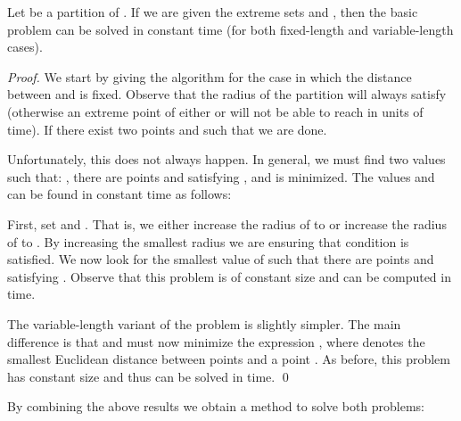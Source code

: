 \documentclass{llncs}
\begin{document}
\begin{lemma}\label{lemma:basic-cte}
Let  be a partition of . If we are given the extreme sets  and , then the basic problem can be solved in constant time (for both fixed-length and variable-length cases).
\end{lemma}
\begin{proof}
We start by giving the algorithm for the case in which the distance between  and  is fixed. Observe that the radius  of the partition will always satisfy  (otherwise an extreme point of either  or  will not be able to reach  in  units of time). If there exist two points  and  such that  we are done.

Unfortunately, this does not always happen. In general, we must find two values  such that:  ,  there are points  and  satisfying , and   is minimized. The values  and  can be found in constant time as follows:

First, set  and . That is, we either increase the radius of  to  or increase the radius of  to . By increasing the smallest radius we are ensuring that condition  is satisfied. We now look for the smallest value of  such that there are points  and  satisfying . Observe that this problem is of constant size and can be computed in  time. 

The variable-length variant of the problem is slightly simpler.
The main difference is that  and  must now minimize the expression  , where  denotes the smallest Euclidean distance between points  and a point . As before, this problem has constant size and thus can be solved in  time. \qed

\end{proof}

By combining the above results we obtain a method to solve both problems:
\end{document}
